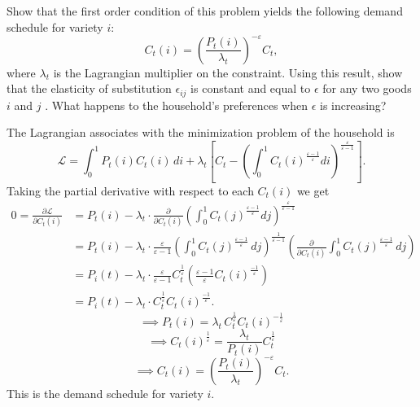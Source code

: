 \documentclass[dvipsnames,11pt]{article}
\begin{document}
\begin{enumerate}
            Show that the first order condition of this problem yields the following demand schedule for variety $i$:
            \begin{equation}\label{eq:pl1}
            C_{t}(i)=\left( \frac{P_{t}(i)}{\lambda_t}\right) ^{-\varepsilon }C_t,  
            \end{equation}
            where $\lambda_t$ is the Lagrangian multiplier on the constraint. Using this result, show that the elasticity of substitution \( \epsilon_{ij} \) is constant and equal to \( \epsilon \) for any two goods \( i \) and \( j \) .  What happens to the household’s preferences when $\epsilon$ is increasing?

\begin{solution}
The Lagrangian associates with the minimization problem of the household is 
\[
\mathcal{L} = \int_0^1 P_t(i) C_t(i)\, di + \lambda_t \left[ C_t - \left( \int_0^1 C_t(i)^{\frac{\varepsilon-1}{\varepsilon}} di \right)^{\frac{\varepsilon}{\varepsilon-1}} \right].
\]
Taking the partial derivative with respect to each \( C_t(i) \) we get
\begin{align*}
0 = \frac{\partial \mathcal{L}}{\partial C_t(i)}
& = P_t(i) - \lambda_t \cdot \frac{\partial}{\partial C_t(i)} 
\left( \int_0^1 C_t(j)^{\frac{\varepsilon-1}{\varepsilon}} dj \right)^{\frac{\varepsilon}{\varepsilon-1}} \\
& = P_t(i) - \lambda_t \cdot \frac{\varepsilon}{\varepsilon - 1} \left( \int^1_0 C_t(j) ^{\frac{\varepsilon - 1}{\varepsilon}} \, dj \right)^{\frac{1}{\varepsilon - 1} } \left( \frac{\partial}{\partial C_t(i)} \int^1_0 C_t(j) ^{\frac{\varepsilon - 1}{\varepsilon}} \, dj \right) \\
& = P_i(t) - \lambda_t \cdot \frac{\varepsilon}{\varepsilon-1} C_t^\frac{1}{\varepsilon}\left(\frac{\varepsilon - 1}{\varepsilon} C_t(i)^{\frac{- 1}{\varepsilon}}\right) \\
& = P_i(t) - \lambda_t \cdot  C_t^\frac{1}{\varepsilon} C_t(i)^{\frac{- 1}{\varepsilon}}.
\end{align*}
\[
    \implies P_t(i) = \lambda_t \, C_t^{\frac{1}{\varepsilon}} C_t(i)^{-\frac{1}{\varepsilon}}
\]
 \[   \implies C_t(i)^{\frac{1}{\varepsilon}} = \frac{\lambda_t}{P_t(i)} C_t^\frac{1}{\varepsilon}  \]
  \[   \implies C_t(i) = \left(\frac{P_t(i)}{\lambda_t}\right)^{-\varepsilon} C_t. \]
This is the demand schedule for variety \( i \).



\end{solution}
\end{enumerate}
\end{document}
